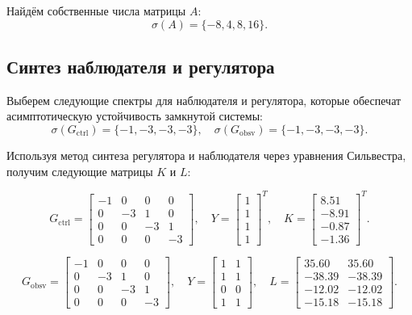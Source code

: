 Найдём собственные числа матрицы $A$:
\[
\sigma(A) = \{-8, 4, 8, 16\}.
\]

\subsection{Синтез наблюдателя и регулятора}

Выберем следующие спектры для наблюдателя и регулятора, которые обеспечат асимптотическую устойчивость замкнутой системы:
\[
\sigma(G_{\text{ctrl}}) = \{-1, -3, -3, -3\}, \quad
\sigma(G_{\text{obsv}}) = \{-1, -3, -3, -3\}.
\]

Используя метод синтеза регулятора и наблюдателя через уравнения Сильвестра, получим следующие матрицы $K$ и $L$:

\[
G_{\text{ctrl}} = \begin{bmatrix}
    -1 & 0 & 0 & 0 \\
    0 & -3 & 1 & 0 \\
    0 & 0 & -3 & 1 \\
    0 & 0 & 0 & -3
\end{bmatrix}, \quad
Y = \begin{bmatrix}
    1 \\
    1 \\
    1 \\
    1
\end{bmatrix}^T, \quad
K = \begin{bmatrix}
    8.51 \\
    -8.91 \\
    -0.87 \\
    -1.36
\end{bmatrix}^T.
\]

\[
G_{\text{obsv}} = \begin{bmatrix}
    -1 & 0 & 0 & 0 \\
    0 & -3 & 1 & 0 \\
    0 & 0 & -3 & 1 \\
    0 & 0 & 0 & -3
\end{bmatrix}, \quad
Y = \begin{bmatrix}
    1 & 1 \\
    1 & 1 \\
    0 & 0 \\
    1 & 1
\end{bmatrix}, \quad
L = \begin{bmatrix}
    35.60 & 35.60 \\
    -38.39 & -38.39 \\
    -12.02 & -12.02 \\
    -15.18 & -15.18
\end{bmatrix}.
\]

